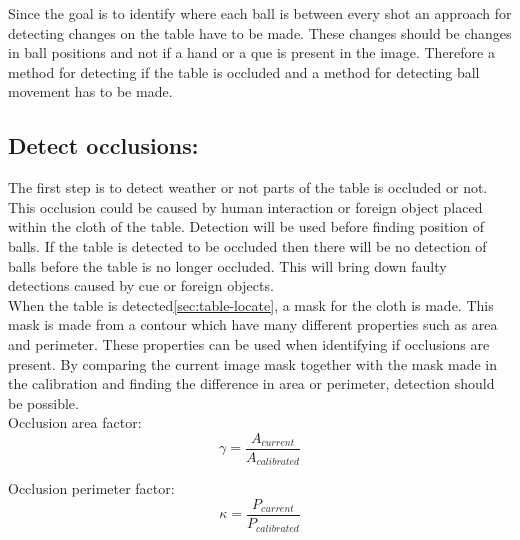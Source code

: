 Since the goal is to identify where each ball is between every shot an approach for detecting changes on the table have to be made. These changes should be changes in ball positions and not if a hand or a que is present in the image. Therefore a method for detecting if the table is occluded and a method for detecting ball movement has to be made.\\

\subsection{Detect occlusions:}
The first step is to detect weather or not parts of the table is occluded or not. This occlusion could be caused by human interaction or foreign object placed within the cloth of the table. Detection will be used before finding position of balls. If the table is detected to be occluded then there will be no detection of balls before the table is no longer occluded. This will bring down faulty detections caused by cue or foreign objects.\\

When the table is detected\ref{sec:table-locate}, a mask for the cloth is made. This mask is made from a contour which have many different properties such as area and perimeter. These properties can be used when identifying if occlusions are present. By comparing the current image mask together with the mask made in the calibration and finding the difference in area or perimeter, detection should be possible.\\

Occlusion area factor:
\begin{equation}
\gamma = \frac{A_{current}}{A_{calibrated}}
\label{eq:area}
\end{equation}

Occlusion perimeter factor:
\begin{equation}
\kappa = \frac{P_{current}}{P_{calibrated}}
\label{eq:perimeter}
\end{equation}


